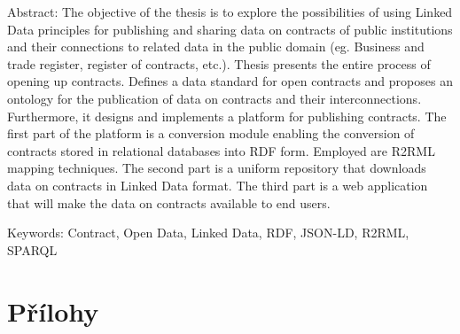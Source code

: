 \documentclass[12pt,a4paper]{report}
\let\openright=\clearpage
\def\chapwithtoc#1{
\chapter*{#1}
\addcontentsline{toc}{chapter}{#1}
}
\begin{document}
{Abstract:
The objective of the thesis is to explore the possibilities of using Linked Data principles for publishing and sharing data on contracts of public institutions and their connections to related data in the public domain (eg. Business and trade register, register of contracts, etc.). Thesis presents the entire process of opening up contracts. Defines a data standard for open contracts and proposes an ontology for the publication of data on contracts and their interconnections. Furthermore, it designs and implements a platform for publishing contracts. The first part of the platform is a conversion module enabling the conversion of contracts stored in relational databases into RDF form. Employed are R2RML mapping techniques. The second part is a uniform repository that downloads data on contracts in Linked Data format. The third part is a web application that will make the data on contracts available to end users.

Keywords:
Contract, Open Data, Linked Data, RDF, JSON-LD, R2RML, SPARQL

\vss}

\newpage


\openright
\pagestyle{plain}
\setcounter{page}{1}
\tableofcontents











% 






\listoffigures
{}

\listoftables
{}

\lstlistoflistings
{}


\chapwithtoc{Přílohy}


\openright
\end{document}
